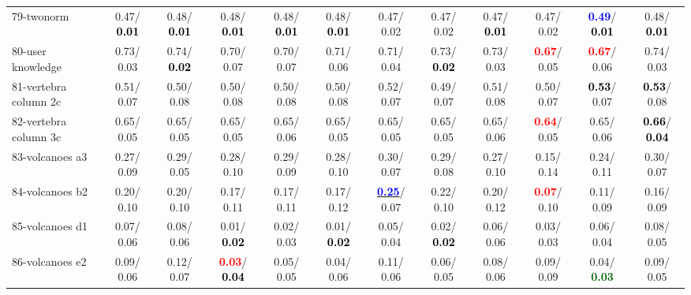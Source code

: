 \begin{table}[h]
\begin{center}
{\begin{tabular}{lc|c|c|c|c|c|c|c|c|c|c}
79-twonorm &   0.47/\textcolor{black}{\textbf{  0.01}} &   0.48/\textcolor{black}{\textbf{  0.01}} &   0.48/\textcolor{black}{\textbf{  0.01}} &   0.48/\textcolor{black}{\textbf{  0.01}} &   0.48/\textcolor{black}{\textbf{  0.01}} &   0.47/  0.02 &   0.47/  0.02 &   0.47/\textcolor{black}{\textbf{  0.01}} &   0.47/  0.02 & \textcolor{blue}{\textbf{  0.49}}/\textcolor{black}{\textbf{  0.01}} &   0.48/\textcolor{black}{\textbf{  0.01}} \\
80-user knowledge &   0.73/  0.03 &   0.74/\textcolor{black}{\textbf{  0.02}} &   0.70/  0.07 &   0.70/  0.07 &   0.71/  0.06 &   0.71/  0.04 &   0.73/\textcolor{black}{\textbf{  0.02}} &   0.73/  0.03 & \textcolor{red}{\textbf{  0.67}}/  0.05 & \textcolor{red}{\textbf{  0.67}}/  0.06 &   0.74/  0.03 \\
81-vertebra column 2c &   0.51/  0.07 &   0.50/  0.08 &   0.50/  0.08 &   0.50/  0.08 &   0.50/  0.08 &   0.52/  0.07 &   0.49/  0.07 &   0.51/  0.08 &   0.50/  0.07 & \textcolor{black}{\textbf{  0.53}}/  0.07 & \textcolor{black}{\textbf{  0.53}}/  0.08 \\
82-vertebra column 3c &   0.65/  0.05 &   0.65/  0.05 &   0.65/  0.05 &   0.65/  0.06 &   0.65/  0.05 &   0.65/  0.05 &   0.65/  0.05 &   0.65/  0.06 & \textcolor{red}{\textbf{  0.64}}/  0.05 &   0.65/  0.06 & \textcolor{black}{\textbf{  0.66}}/\textcolor{black}{\textbf{  0.04}} \\
83-volcanoes a3 &   0.27/  0.09 &   0.29/  0.05 &   0.28/  0.10 &   0.29/  0.09 &   0.28/  0.10 &   0.30/  0.07 &   0.29/  0.08 &   0.27/  0.10 &   0.15/  0.14 &   0.24/  0.11 &   0.30/  0.07 \\
84-volcanoes b2 &   0.20/  0.10 &   0.20/  0.10 &   0.17/  0.11 &   0.17/  0.11 &   0.17/  0.12 & \underline{\textcolor{blue}{\textbf{  0.25}}}/  0.07 &   0.22/  0.10 &   0.20/  0.12 & \textcolor{red}{\textbf{  0.07}}/  0.10 &   0.11/  0.09 &   0.16/  0.09 \\
85-volcanoes d1 &   0.07/  0.06 &   0.08/  0.06 &   0.01/\textcolor{black}{\textbf{  0.02}} &   0.02/  0.03 &   0.01/\textcolor{black}{\textbf{  0.02}} &   0.05/  0.04 &   0.02/\textcolor{black}{\textbf{  0.02}} &   0.06/  0.06 &   0.03/  0.03 &   0.06/  0.04 &   0.08/  0.05 \\ \hline
86-volcanoes e2 &   0.09/  0.06 &   0.12/  0.07 & \textcolor{red}{\textbf{  0.03}}/\textcolor{black}{\textbf{  0.04}} &   0.05/  0.05 &   0.04/  0.06 &   0.11/  0.06 &   0.06/  0.05 &   0.08/  0.06 &   0.09/  0.09 &   0.04/\textcolor{darkgreen}{\textbf{  0.03}} &   0.09/  0.05 \\

\end{tabular}}
\end{center}
\end{table}
